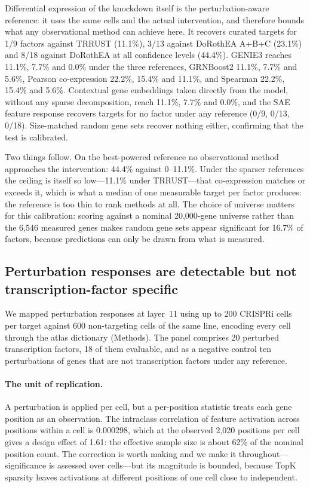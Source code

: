\documentclass[onecolumn,11pt]{article}
\begin{document}
Differential expression of the knockdown itself is the perturbation-aware reference: it uses the
same cells and the actual intervention, and therefore bounds what any observational method can
achieve here. It recovers curated targets for 1/9 factors against TRRUST (11.1\%), 3/13 against
DoRothEA A+B+C (23.1\%) and 8/18 against DoRothEA at all confidence levels (44.4\%). GENIE3 reaches
11.1\%, 7.7\% and 0.0\% under the three references, GRNBoost2 11.1\%, 7.7\% and 5.6\%, Pearson
co-expression 22.2\%, 15.4\% and 11.1\%, and Spearman 22.2\%, 15.4\% and 5.6\%. Contextual gene
embeddings taken directly from the model, without any sparse decomposition, reach 11.1\%, 7.7\% and
0.0\%, and the SAE feature response recovers targets for no factor under any reference (0/9, 0/13,
0/18). Size-matched random gene sets recover nothing either, confirming that the test is
calibrated.

Two things follow. On the best-powered reference no observational method approaches the
intervention: 44.4\% against 0--11.1\%. Under the sparser references the ceiling is itself so
low---11.1\% under TRRUST---that co-expression matches or exceeds it, which is what a median of one
measurable target per factor produces: the reference is too thin to rank methods at all.
The choice of universe matters for this calibration: scoring against a nominal 20,000-gene universe
rather than the 6,546 measured genes makes random gene sets appear significant for 16.7\% of
factors, because predictions can only be drawn from what is measured.

\subsection*{Perturbation responses are detectable but not transcription-factor specific}
\label{sec:perturbation}

We mapped perturbation responses at layer~11 using up to 200 CRISPRi cells per target against 600
non-targeting cells of the same line, encoding every cell through the atlas dictionary (Methods).
The panel comprises 20 perturbed transcription factors, 18 of them evaluable, and as a
negative control ten
perturbations of genes that are not transcription factors under any reference.

\paragraph{The unit of replication.} A perturbation is applied per cell, but a per-position
statistic treats each gene position as an observation. The intraclass correlation of feature
activation across positions within a cell is 0.000298, which at the observed 2,020 positions per
cell gives a design effect of 1.61: the effective sample size is about 62\% of the nominal position
count. The correction is worth making and we make it throughout---significance is assessed over
cells---but its magnitude is bounded, because TopK sparsity leaves activations at different
positions of one cell close to independent.
\end{document}
